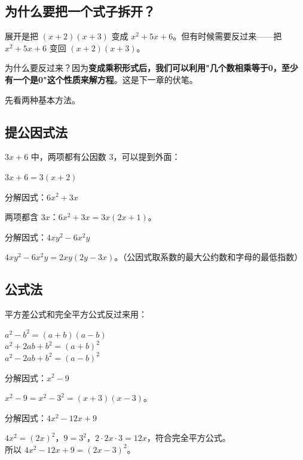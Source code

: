 \subsection*{为什么要把一个式子拆开？}

展开是把 $(x+2)(x+3)$ 变成 $x^2+5x+6$。但有时候需要反过来——把 $x^2+5x+6$ 变回 $(x+2)(x+3)$。

为什么要反过来？因为\textbf{变成乘积形式后，我们可以利用"几个数相乘等于0，至少有一个是0"这个性质来解方程}。这是下一章的伏笔。

先看两种基本方法。

\subsection*{提公因式法}

$3x + 6$ 中，两项都有公因数 3，可以提到外面：

$3x + 6 = 3(x + 2)$

\begin{example}
分解因式：$6x^2 + 3x$
\end{example}
\begin{solution}
两项都含 $3x$：$6x^2 + 3x = 3x(2x + 1)$。
\end{solution}

\begin{example}
分解因式：$4xy^2 - 6x^2y$
\end{example}
\begin{solution}
$4xy^2 - 6x^2y = 2xy(2y - 3x)$。（公因式取系数的最大公约数和字母的最低指数）
\end{solution}

\subsection*{公式法}

平方差公式和完全平方公式反过来用：

$a^2 - b^2 = (a+b)(a-b)$\\
$a^2 + 2ab + b^2 = (a+b)^2$\\
$a^2 - 2ab + b^2 = (a-b)^2$

\begin{example}
分解因式：$x^2 - 9$
\end{example}
\begin{solution}
$x^2 - 9 = x^2 - 3^2 = (x+3)(x-3)$。
\end{solution}

\begin{example}
分解因式：$4x^2 - 12x + 9$
\end{example}
\begin{solution}
$4x^2 = (2x)^2$，$9 = 3^2$，$2\cdot2x\cdot3 = 12x$，符合完全平方公式。\\
所以 $4x^2 - 12x + 9 = (2x-3)^2$。
\end{solution}

